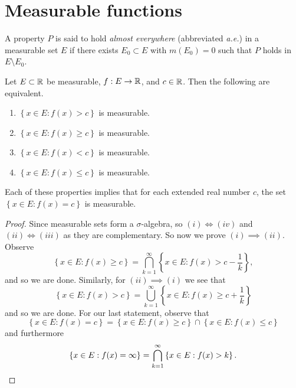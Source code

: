 \section{Measurable functions}

\begin{definition}
	A property $P$ is said to hold \emph{almost everywhere}
	(abbreviated \emph{a.e.})
	in a measurable set $E$ if there exists $E_0 \subset E$
	with $m(E_0) = 0$ such that $P$ holds in $E \setminus E_0$.
\end{definition}

\begin{proposition}[]
	\label{prop:measurable}
	Let $E \subset \mathbb{R}$ be measurable, $f: E \to \mathbb{R}$, and $c \in \mathbb{R}$.
	Then the following are equivalent.
	\begin{enumerate}
		\item
			$
				\left\{
					x \in E: f(x) > c
				\right\}
			$
			is measurable.

		\item
			$
				\left\{
					x \in E: f(x) \geq c
				\right\}
			$
			is measurable.

		\item
			$
				\left\{
					x \in E: f(x) < c
				\right\}
			$
			is measurable.

		\item
			$
				\left\{
					x \in E: f(x) \leq c
				\right\}
			$
			is measurable.
	\end{enumerate}
	Each of these properties implies that for each extended real number $c$,
	the set
	$
		\left\{
			x \in E: f(x) = c
		\right\}
	$
	is measurable.
\end{proposition}

\begin{proof}
	Since measurable sets form a $\sigma$-algebra,
	so $(i) \iff (iv)$ and $(ii) \iff (iii)$ as they are
	complementary.
	So now we prove $(i) \implies (ii)$.
	Observe
	\[
		\left\{
			x \in E: f(x) \geq c
		\right\}
		= \bigcap_{k=1}^\infty \left\{
			x \in E: f(x) > c - \frac1k
		\right\},
	\]
	and so we are done.
	Similarly, for $(ii) \implies (i)$ we see that
	\[
		\left\{
			x \in E: f(x) > c
		\right\}
		= \bigcup_{k=1}^\infty \left\{
			x \in E: f(x) \geq c + \frac1k
		\right\}
	\]
	and so we are done.
	For our last statement, observe that
	\[
		\left\{
			x \in E: f(x) = c
		\right\}
		=
		\left\{
			x \in E: f(x) \geq c
		\right\}
		\cap
		\left\{
			x \in E: f(x) \leq c
		\right\}
	\]
	and furthermore
	\[
		\left\{
			x \in E: f(x) = \infty
		\right\}
		=
		\bigcap_{k=1}^\infty
		\left\{
			x \in E: f(x) > k
		\right\}. \qedhere
	\]
\end{proof}

